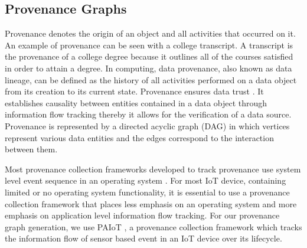 %
%
%
%
%
%
%




\subsection{Provenance Graphs}

Provenance denotes the origin of an object and all activities that occurred on it. An example of provenance can be seen with a college transcript. A transcript is the provenance of a college degree because it outlines all of the courses satisfied in order to attain a degree. In computing, data provenance, also known as data lineage, can be defined
as the history of all activities performed on a data object from its creation to its current state. Provenance ensures data trust \cite{Bertino2015}. It establishes causality between entities contained in a data object through information flow tracking thereby it allows for the verification of a data source. Provenance is represented by a directed acyclic graph (DAG) in which vertices represent various data entities and the edges correspond to the interaction between them. 



Most provenance collection frameworks developed to track provenance use system level event sequence in an operating system \cite{pasquier-socc2017,acsac,Muniswamy-Reddy}. For most IoT device, containing limited or no operating system functionality, it is essential to use a provenance collection framework that places less emphasis on an operating system and more emphasis on application level information flow tracking. For our provenance graph generation, we use PAIoT \cite{paiot}, a provenance collection framework which tracks the information flow of sensor based event in an IoT device over its lifecycle. 


%

